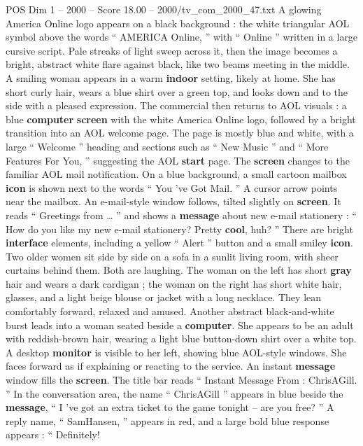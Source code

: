 \begin{textsample}{POS Dim 1 – 2000 – Score 18.00 – 2000/tv\_com\_2000\_47.txt}  \label{ex:f1_pos_033}
A glowing America Online logo appears on a black background : the white triangular AOL symbol above the words “ AMERICA Online, ” with “ Online ” written in a large cursive script.
Pale streaks of light sweep across it, then the image becomes a bright, abstract white flare against black, like two beams meeting in the middle.
A smiling woman appears in a warm \textbf{indoor} setting, likely at home.
She has short curly hair, wears a blue shirt over a green top, and looks down and to the side with a pleased expression.
The commercial then returns to AOL visuals : a blue \textbf{computer} \textbf{screen} with the white America Online logo, followed by a bright transition into an AOL welcome page.
The page is mostly blue and white, with a large “ Welcome ” heading and sections such as “ New Music ” and “ More Features For You, ” suggesting the AOL \textbf{start} page.
The \textbf{screen} changes to the familiar AOL mail notification.
On a blue background, a small cartoon mailbox \textbf{icon} is shown next to the words “ You ’ve Got Mail. ” A cursor arrow points near the mailbox.
An e-mail-style window follows, tilted slightly on \textbf{screen}.
It reads “ Greetings from … ” and shows a \textbf{message} about new e-mail stationery : “ How do you like my new e-mail stationery?
Pretty \textbf{cool}, huh? ” There are bright \textbf{interface} elements, including a yellow “ Alert ” button and a small smiley \textbf{icon}.
Two older women sit side by side on a sofa in a sunlit living room, with sheer curtains behind them.
Both are laughing.
The woman on the left has short \textbf{gray} hair and wears a dark cardigan ; the woman on the right has short white hair, glasses, and a light beige blouse or jacket with a long necklace.
They lean comfortably forward, relaxed and amused.
Another abstract black-and-white burst leads into a woman seated beside a \textbf{computer}.
She appears to be an adult with reddish-brown hair, wearing a light blue button-down shirt over a white top.
A desktop \textbf{monitor} is visible to her left, showing blue AOL-style windows.
She faces forward as if explaining or reacting to the service.
An instant \textbf{message} window fills the \textbf{screen}.
The title bar reads “ Instant Message From : ChrisAGill. ” In the conversation area, the name “ ChrisAGill ” appears in blue beside the \textbf{message}, “ I ’ve got an extra ticket to the game tonight -- are you free? ” A reply name, “ SamHansen, ” appears in red, and a large bold blue response appears : “ Definitely!

\end{textsample}
